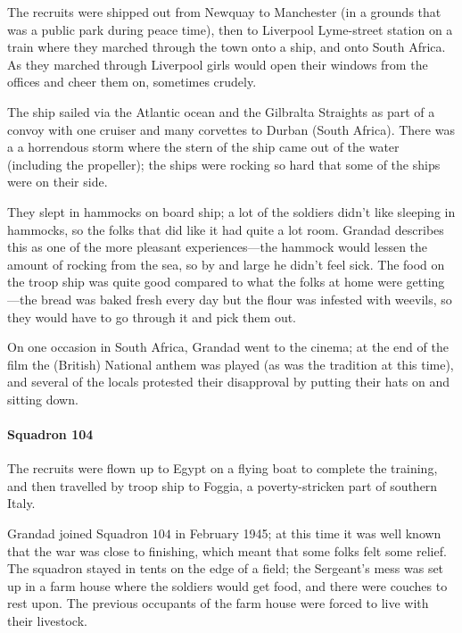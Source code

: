 The recruits were shipped out from Newquay to Manchester (in a grounds that was a public park during peace
time), then to Liverpool Lyme-street station on a train where they marched through the town onto a ship,
and onto South Africa.  As they marched through Liverpool girls would open their windows from the offices and
cheer them on, sometimes crudely.

The ship sailed via the Atlantic ocean and the Gilbralta Straights as part of a convoy with one cruiser and many corvettes to Durban (South Africa).
There was a a horrendous storm where the stern of the ship came out of the water (including the propeller);
the ships were rocking so hard that some of the ships were on their side.

They slept in hammocks on board ship; a lot of the soldiers
didn't like sleeping in hammocks, so the folks that did like it had quite a lot room. Grandad describes this as
one of the more pleasant experiences---the hammock would lessen the amount of rocking from the
sea, so by and large he didn't feel sick. The food on the troop ship was quite good compared
to what the folks at home were getting---the bread was baked fresh every day but the flour was
infested with weevils, so they would have to go through it and pick them out.

\begin{figure}
	\centering
\end{figure}
On one occasion in South Africa, Grandad went to the cinema; at the end of the film
the (British) National anthem was played (as was the tradition at this time), and several of the
locals protested their disapproval by putting their hats on and sitting down.

\paragraph{Squadron 104} The recruits were flown up to Egypt on a flying boat to complete the training, and
then travelled by troop ship to Foggia, a poverty-stricken part of southern Italy.

Grandad joined Squadron $104$ in February 1945; at this time it was well known that
the war was close to finishing, which meant that some folks felt some relief. The
squadron stayed in tents on the edge of a field; the Sergeant's mess was set up
in a farm house where the soldiers would get food, and there were couches to rest upon.
The previous occupants of the farm house were forced to live with their livestock.

